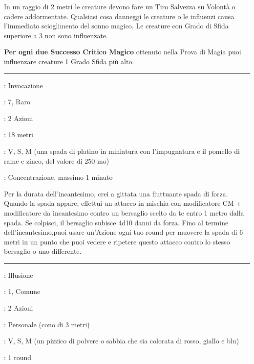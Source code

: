 \begin{multicols}{2}
In un raggio di 2 metri le creature devono fare un Tiro Salvezza su Volontà o cadere addormentate. Qualsiasi cosa danneggi le creature o le influenzi causa l'immediato scioglimento del sonno magico. Le creature con Grado di Sfida superiore a 3 non sono influenzate.

\textbf{Per ogni due Successo Critico Magico} ottenuto nella Prova di Magia puoi influenzare creature 1 Grado Sfida più alto.

\smallskip\noindent\rule{\linewidth}{2pt} \hypertarget{Spada Arcana}{}\smallskip{}
\noindent
\begin{description}[noitemsep, topsep=0pt, parsep=0pt, partopsep=0pt, leftmargin=0cm, labelwidth=2.8cm]
	\item[\textbf{Lista di Magia}]: Invocazione
	\item[\textbf{Livello}]: 7, Raro
	\item[\textbf{T. di Lancio}]: 2 Azioni
	\item[\textbf{Gittata}]: 18 metri
	\item[\textbf{Componenti}]: V, S, M (una spada di platino in miniatura con l'impugnatura e il pomello di rame e zinco, del valore di 250 mo)
	\item[\textbf{Durata}]: Concentrazione, massimo 1 minuto
\end{description}

Per la durata dell'incantesimo, crei a gittata una fluttuante spada di forza. Quando la spada appare, effettui un attacco in mischia con modificatore CM + modificatore da incantesimo contro un bersaglio scelto da te entro 1 metro dalla spada. Se colpisci, il bersaglio subisce 4d10 danni da forza. Fino al termine dell'incantesimo,puoi usare un'Azione ogni tuo round per muovere la spada di 6 metri in un punto che puoi vedere e ripetere questo attacco contro lo stesso bersaglio o uno differente.

\smallskip\noindent\rule{\linewidth}{2pt} \hypertarget{Spruzzo Colorato}{}\smallskip{}
\noindent
\begin{description}[noitemsep, topsep=0pt, parsep=0pt, partopsep=0pt, leftmargin=0cm, labelwidth=2.8cm]
	\item[\textbf{Lista di Magia}]: Illusione
	\item[\textbf{Livello}]: 1, Comune
	\item[\textbf{T. di Lancio}]: 2 Azioni
	\item[\textbf{Gittata}]: Personale (cono di 3 metri)
	\item[\textbf{Componenti}]: V, S, M (un pizzico di polvere o sabbia che sia colorata di rosso, giallo e blu)
	\item[\textbf{Durata}]: 1 round
\end{description}


\end{multicols}
